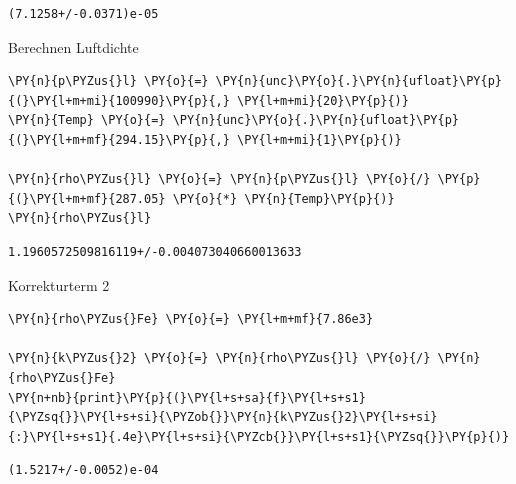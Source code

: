     \begin{Verbatim}[commandchars=\\\{\}]
(7.1258+/-0.0371)e-05
    \end{Verbatim}

    Berechnen Luftdichte

    \begin{tcolorbox}[breakable, size=fbox, boxrule=1pt, pad at break*=1mm,colback=cellbackground, colframe=cellborder]
\begin{Verbatim}[commandchars=\\\{\}]
\PY{n}{p\PYZus{}l} \PY{o}{=} \PY{n}{unc}\PY{o}{.}\PY{n}{ufloat}\PY{p}{(}\PY{l+m+mi}{100990}\PY{p}{,} \PY{l+m+mi}{20}\PY{p}{)}
\PY{n}{Temp} \PY{o}{=} \PY{n}{unc}\PY{o}{.}\PY{n}{ufloat}\PY{p}{(}\PY{l+m+mf}{294.15}\PY{p}{,} \PY{l+m+mi}{1}\PY{p}{)}

\PY{n}{rho\PYZus{}l} \PY{o}{=} \PY{n}{p\PYZus{}l} \PY{o}{/} \PY{p}{(}\PY{l+m+mf}{287.05} \PY{o}{*} \PY{n}{Temp}\PY{p}{)}
\PY{n}{rho\PYZus{}l} 
\end{Verbatim}
\end{tcolorbox}

            \begin{tcolorbox}[breakable, size=fbox, boxrule=.5pt, pad at break*=1mm, opacityfill=0]
\begin{Verbatim}[commandchars=\\\{\}]
1.1960572509816119+/-0.004073040660013633
\end{Verbatim}
\end{tcolorbox}
        
    Korrekturterm 2

    \begin{tcolorbox}[breakable, size=fbox, boxrule=1pt, pad at break*=1mm,colback=cellbackground, colframe=cellborder]
\begin{Verbatim}[commandchars=\\\{\}]
\PY{n}{rho\PYZus{}Fe} \PY{o}{=} \PY{l+m+mf}{7.86e3}

\PY{n}{k\PYZus{}2} \PY{o}{=} \PY{n}{rho\PYZus{}l} \PY{o}{/} \PY{n}{rho\PYZus{}Fe}
\PY{n+nb}{print}\PY{p}{(}\PY{l+s+sa}{f}\PY{l+s+s1}{\PYZsq{}}\PY{l+s+si}{\PYZob{}}\PY{n}{k\PYZus{}2}\PY{l+s+si}{:}\PY{l+s+s1}{.4e}\PY{l+s+si}{\PYZcb{}}\PY{l+s+s1}{\PYZsq{}}\PY{p}{)}
\end{Verbatim}
\end{tcolorbox}

    \begin{Verbatim}[commandchars=\\\{\}]
(1.5217+/-0.0052)e-04
    \end{Verbatim}

